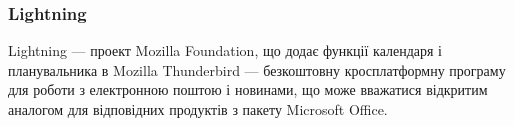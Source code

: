 \subsubsection{Lightning}

Lightning — проект Mozilla Foundation, що додає функції календаря і планувальника в Mozilla Thunderbird — безкоштовну кросплатформну програму для роботи з електронною поштою і новинами, що може вважатися відкритим аналогом для відповідних продуктів з пакету Microsoft Office.
